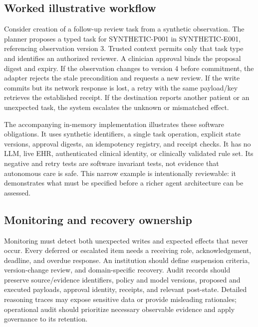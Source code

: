\subsection{Worked illustrative workflow}
Consider creation of a follow-up review task from a synthetic observation. The planner proposes a typed task for SYNTHETIC-P001 in SYNTHETIC-E001, referencing observation version 3. Trusted context permits only that task type and identifies an authorized reviewer. A clinician approval binds the proposal digest and expiry. If the observation changes to version 4 before commitment, the adapter rejects the stale precondition and requests a new review. If the write commits but its network response is lost, a retry with the same payload/key retrieves the established receipt. If the destination reports another patient or an unexpected task, the system escalates the unknown or mismatched effect.

The accompanying in-memory implementation illustrates these software obligations. It uses synthetic identifiers, a single task operation, explicit state versions, approval digests, an idempotency registry, and receipt checks. It has no LLM, live EHR, authenticated clinical identity, or clinically validated rule set. Its negative and retry tests are software invariant tests, not evidence that autonomous care is safe. This narrow example is intentionally reviewable: it demonstrates what must be specified before a richer agent architecture can be assessed.

\subsection{Monitoring and recovery ownership}
Monitoring must detect both unexpected writes and expected effects that never occur. Every deferred or escalated item needs a receiving role, acknowledgement, deadline, and overdue response. An institution should define suspension criteria, version-change review, and domain-specific recovery. Audit records should preserve source/evidence identifiers, policy and model versions, proposed and executed payloads, approval identity, receipts, and relevant post-state. Detailed reasoning traces may expose sensitive data or provide misleading rationales; operational audit should prioritize necessary observable evidence and apply governance to its retention.
